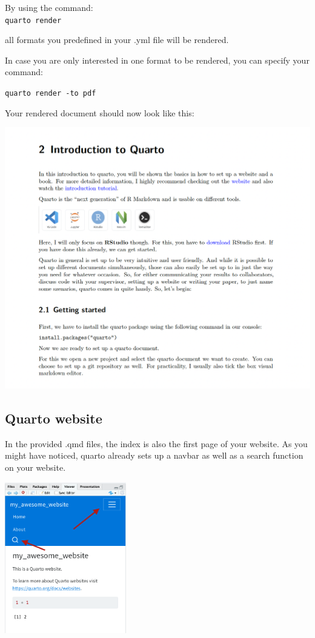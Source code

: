 \documentclass[
  letterpaper,
  DIV=11,
  numbers=noendperiod]{scrreprt}
\begin{document}
By using the command:\\
\texttt{quarto\ render}

all formats you predefined in your .yml file will be rendered.

In case you are only interested in one format to be rendered, you can
specify your command:

\texttt{quarto\ render\ -to\ pdf}

Your rendered document should now look like this:

\includegraphics{img/quarto_intro/Screenshot 2023-10-17 at 14.15.05.png}

\hypertarget{quarto-website}{%
\subsection{Quarto website}\label{quarto-website}}

In the provided .qmd files, the index is also the first page of your
website. As you might have noticed, quarto already sets up a navbar as
well as a search function on your website.

\includegraphics[width=2.08333in,height=\textheight]{img/quarto_intro/Screenshot 2023-10-11 at 14.09.08.png}
\end{document}
